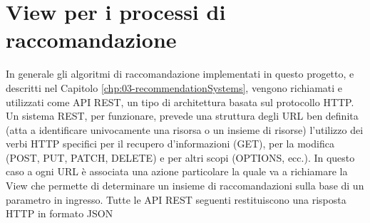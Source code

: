 \section*{View per i processi di raccomandazione}
In generale gli algoritmi di raccomandazione implementati in questo progetto, e descritti nel Capitolo \ref{chp:03-recommendationSystems}, 
vengono richiamati e utilizzati come API REST, un tipo di architettura basata sul protocollo HTTP. Un sistema REST, per funzionare, prevede 
una struttura degli URL ben definita (atta a identificare univocamente una risorsa o un insieme di risorse) l'utilizzo dei verbi HTTP specifici 
per il recupero d'informazioni (GET), per la modifica (POST, PUT, PATCH, DELETE) e per altri scopi (OPTIONS, ecc.).\hfill\break
In questo caso a ogni URL è associata una azione particolare la quale va a richiamare la View che permette di determinare un insieme di 
raccomandazioni sulla base di un parametro in ingresso. Tutte le API REST seguenti restituiscono una risposta 
HTTP in formato JSON \hfill\break
